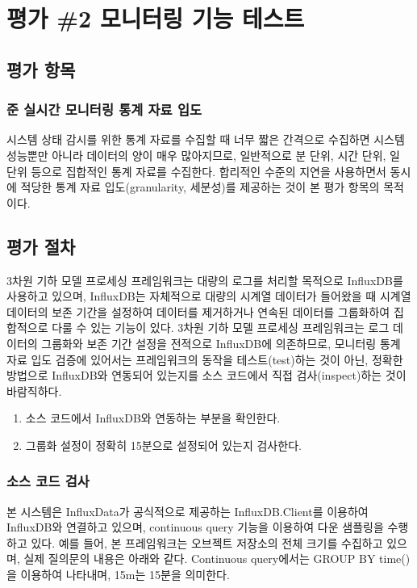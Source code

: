 \documentclass[11pt,oneside,openany,itemph,a4paper,chapter]{oblivoir}
\begin{document}
\section{평가 \#2\label{test2} 모니터링 기능 테스트}
\subsection{평가 항목}
\subsubsection{준 실시간 모니터링 통계 자료 입도}
시스템 상태 감시를 위한 통계 자료를 수집할 때 너무 짧은 간격으로 수집하면 시스템 성능뿐만 아니라 데이터의 양이 매우 많아지므로, 일반적으로 분 단위, 시간 단위, 일 단위 등으로 집합적인 통계 자료를 수집한다. 합리적인 수준의 지연을 사용하면서 동시에 적당한 통계 자료 입도(granularity, 세분성)를 제공하는 것이 본 평가 항목의 목적이다.

\subsection{평가 절차}
3차원 기하 모델 프로세싱 프레임워크는 대량의 로그를 처리할 목적으로 InfluxDB를 사용하고 있으며, InfluxDB는 자체적으로 대량의 시계열 데이터가 들어왔을 때 시계열 데이터의 보존 기간을 설정하여 데이터를 제거하거나 연속된 데이터를 그룹화하여 집합적으로 다룰 수 있는 기능이 있다. 3차원 기하 모델 프로세싱 프레임워크는 로그 데이터의 그룹화와 보존 기간 설정을 전적으로 InfluxDB에 의존하므로, 모니터링 통계 자료 입도 검증에 있어서는 프레임워크의 동작을 테스트(test)하는 것이 아닌, 정확한 방법으로 InfluxDB와 연동되어 있는지를 소스 코드에서 직접 검사(inspect)하는 것이 바람직하다.
\begin{enumerate}
    \item 소스 코드에서 InfluxDB와 연동하는 부분을 확인한다.
    \item 그룹화 설정이 정확히 15분으로 설정되어 있는지 검사한다.
\end{enumerate}

\subsubsection{소스 코드 검사}
본 시스템은 InfluxData가 공식적으로 제공하는 InfluxDB.Client를 이용하여 InfluxDB와 연결하고 있으며, continuous query 기능을 이용하여 다운 샘플링을 수행하고 있다. 예를 들어, 본 프레임워크는 오브젝트 저장소의 전체 크기를 수집하고 있으며, 실제 질의문의 내용은 아래와 같다. Continuous query에서는 GROUP BY time()을 이용하여 나타내며, 15m는 15분을 의미한다.
\end{document}
